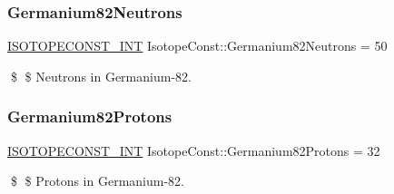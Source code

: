 \subsubsection{\texorpdfstring{Germanium82\+Neutrons}{Germanium82Neutrons}}
{\footnotesize\ttfamily \mbox{\hyperlink{group___isotope_const-_macros_ga5f18360b3e99483a35c32d789e62621c}{I\+S\+O\+T\+O\+P\+E\+C\+O\+N\+S\+T\+\_\+\+I\+NT}} Isotope\+Const\+::\+Germanium82\+Neutrons = 50}

\$ \$ Neutrons in Germanium-\/82. \mbox{\label{group___isotope_const-_germanium-_ge82_ga2aa5450e11fab6019a1f611dcea4b741}} 
\subsubsection{\texorpdfstring{Germanium82\+Protons}{Germanium82Protons}}
{\footnotesize\ttfamily \mbox{\hyperlink{group___isotope_const-_macros_ga5f18360b3e99483a35c32d789e62621c}{I\+S\+O\+T\+O\+P\+E\+C\+O\+N\+S\+T\+\_\+\+I\+NT}} Isotope\+Const\+::\+Germanium82\+Protons = 32}

\$ \$ Protons in Germanium-\/82. 